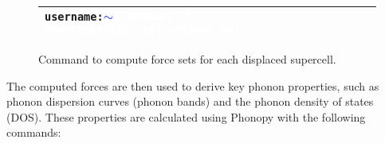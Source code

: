 \begin{figure}[H]  
	\begin{tabular}{>{\columncolor{black}}p{\linewidth}}  
		\texttt{\textcolor{green!70!black}{username:\textcolor{blue}{$\sim$}}\textcolor{white}{\$} \textcolor{white}{phonopy -f pho\_POSCAR\{01..10\}/vasprun.xml}} \\ \hline  
	\end{tabular}  
	\centering  
	\caption{Command to compute force sets for each displaced supercell.}  
	\label{fig:fig3.6}  
	\label{forces}  
\end{figure}  

The computed forces are then used to derive key phonon properties, such as phonon dispersion curves (phonon bands) and the phonon density of states (DOS). These properties are calculated using Phonopy with the following commands:

